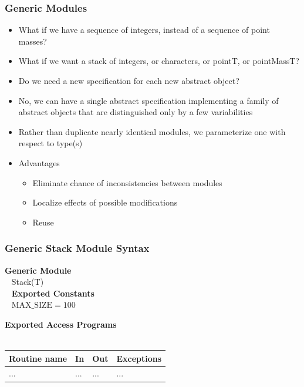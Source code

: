 \documentclass[t,12pt,numbers,fleqn]{beamer}
\begin{document}
\begin{frame}
\frametitle{Generic Modules}

\begin{itemize}
\item What if we have a sequence of integers, instead of a sequence of point masses?
\item What if we want a stack of integers, or characters, or pointT, or pointMassT?
\item Do we need a new specification for each new abstract object?
\item No, we can have a single abstract specification implementing a family of abstract objects that are distinguished
only by a few variabilities
\item Rather than duplicate nearly identical modules, we parameterize one  with respect to
type(s)
\item Advantages
\begin{itemize}
\item Eliminate chance of inconsistencies between modules
\item Localize effects of possible modifications
\item Reuse
\end{itemize}
\end{itemize}

\end{frame}


\begin{frame}
\frametitle{Generic Stack Module Syntax}

\textbf{Generic Module}\\
~\newline
Stack(T)\\
~\newline
\textbf{Exported Constants}\\
~\newline
$\mbox{MAX\_SIZE} = 100$
~\newline

\textbf{Exported Access Programs}\\
~\newline
\begin{tabular}{| l | l | l | l |}
\hline
\textbf{Routine name} & \textbf{In} & \textbf{Out} & \textbf{Exceptions}\\
\hline
... & ... & ... & ...\\
\hline
\end{tabular}

\end{frame}
\end{document}
